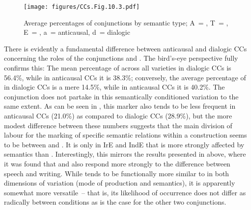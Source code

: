 \begin{figure}[p]
\texttt{[image: figures/CCs.Fig.10.3.pdf]}
\caption{\label{bkm:Ref59921288}\label{fig:10.3}Average percentages of conjunctions by semantic type; A~= , T~= , E~= , a~= anticausal, d~= dialogic}
\end{figure}

\begin{sloppypar}
There is evidently a fundamental difference between anticausal and dialogic CCs concerning the roles of the conjunctions  and . The bird’s-eye perspective fully confirms this: The mean percentage of  across all varieties in dialogic CCs is 56.4\%, while in anticausal CCs it is 38.3\%; conversely, the average percentage of  in dialogic CCs is a mere 14.5\%, while in anticausal CCs it is 40.2\%. The conjunction  does not partake in this semantically conditioned variation to the same extent. As can be seen in , this marker also tends to be less frequent in anticausal CCs (21.0\%) as compared to dialogic CCs (28.9\%), but the more modest difference between these numbers suggests that the main division of labour for the marking of specific semantic relations within a construction seems to be between  and . It is only in IrE and IndE that  is more strongly affected by semantics than . Interestingly, this mirrors the results presented in  above, where it was found that  and  also respond more strongly to the difference between speech and writing. While  tends to be functionally more similar to  in both dimensions of variation (mode of production and semantics), it is apparently somewhat more versatile~– that is, its likelihood of occurrence does not differ as radically between conditions as is the case for the other two conjunctions.
\end{sloppypar}

